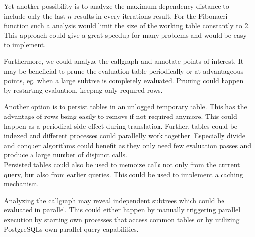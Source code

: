 Yet another possibility is to analyze the maximum dependency distance to include only the last $n$ results in every iterations result. For the Fibonacci-function such a analysis would limit the size of the working table constantly to 2. This approach could give a great speedup for many problems and would be easy to implement.

Furthermore, we could analyze the callgraph and annotate points of interest. It may be beneficial to prune the evaluation table periodically or at advantageous points, eg. when a large subtree is completely evaluated. Pruning could happen by restarting evaluation, keeping only required rows.

Another option is to persist tables in an unlogged temporary table. This has the advantage of rows being easily to remove if not required anymore. This could happen as a periodical side-effect during translation. Further, tables could be indexed and different processes could parallelly work together. Especially divide and conquer algorithms could benefit as they only need few evaluation passes and produce a large number of disjunct calls.\\
Persisted tables could also be used to memoize calls not only from the current query, but also from earlier queries. This could be used to implement a caching mechanism.

Analyzing the callgraph may reveal independent subtrees which could be evaluated in parallel. This could either happen by manually triggering parallel execution by starting own processes that access common tables or by utilizing PostgreSQLs own parallel-query capabilities. 